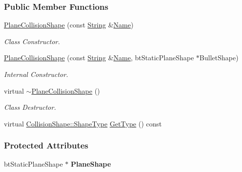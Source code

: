 \subsubsection*{Public Member Functions}
\begin{DoxyCompactItemize}
\item 
\hyperlink{classMezzanine_1_1PlaneCollisionShape_a70b396bd0e49255dcba099c00b6a073d}{PlaneCollisionShape} (const \hyperlink{namespaceMezzanine_acf9fcc130e6ebf08e3d8491aebcf1c86}{String} \&\hyperlink{classMezzanine_1_1CollisionShape_aac524c5c56fa4d158bc071f8aecfbe79}{Name})
\begin{DoxyCompactList}\small\item\em Class Constructor. \item\end{DoxyCompactList}\item 
\hyperlink{classMezzanine_1_1PlaneCollisionShape_aa641f7c918814e3c7555c478c1019161}{PlaneCollisionShape} (const \hyperlink{namespaceMezzanine_acf9fcc130e6ebf08e3d8491aebcf1c86}{String} \&\hyperlink{classMezzanine_1_1CollisionShape_aac524c5c56fa4d158bc071f8aecfbe79}{Name}, btStaticPlaneShape $\ast$BulletShape)
\begin{DoxyCompactList}\small\item\em Internal Constructor. \item\end{DoxyCompactList}\item 
\hypertarget{classMezzanine_1_1PlaneCollisionShape_a44a43ced3fff5cd96459f9f832023c39}{
virtual \hyperlink{classMezzanine_1_1PlaneCollisionShape_a44a43ced3fff5cd96459f9f832023c39}{$\sim$PlaneCollisionShape} ()}
\label{classMezzanine_1_1PlaneCollisionShape_a44a43ced3fff5cd96459f9f832023c39}

\begin{DoxyCompactList}\small\item\em Class Destructor. \item\end{DoxyCompactList}\item 
virtual \hyperlink{classMezzanine_1_1CollisionShape_ad04186055565998879b64176d6dd100d}{CollisionShape::ShapeType} \hyperlink{classMezzanine_1_1PlaneCollisionShape_aeb4b5e1a235023d375b5514065a5e382}{GetType} () const 
\end{DoxyCompactItemize}
\subsubsection*{Protected Attributes}
\begin{DoxyCompactItemize}
\item 
\hypertarget{classMezzanine_1_1PlaneCollisionShape_ac0c34fc0edfb4213b970d6a62be63cda}{
btStaticPlaneShape $\ast$ {\bfseries PlaneShape}}
\label{classMezzanine_1_1PlaneCollisionShape_ac0c34fc0edfb4213b970d6a62be63cda}

\end{DoxyCompactItemize}


